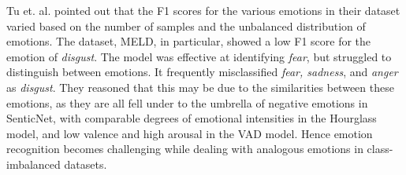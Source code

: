 Tu et. al. pointed out that the F1 scores for the various emotions in their dataset varied based on the number of samples and the unbalanced distribution of emotions. The dataset, MELD, in particular, showed a low F1 score for the emotion of \textit{disgust}. The model was effective at identifying \textit{fear}, but struggled to distinguish between emotions. It frequently misclassified \textit{fear, sadness}, and \textit{anger} as \textit{disgust}. They reasoned that this may be due to the similarities between these emotions, as they are all fell under to the umbrella of negative emotions in SenticNet, with comparable degrees of emotional intensities in the Hourglass model, and low valence and high arousal in the VAD model. Hence emotion recognition becomes challenging while dealing with analogous emotions in class-imbalanced datasets.


